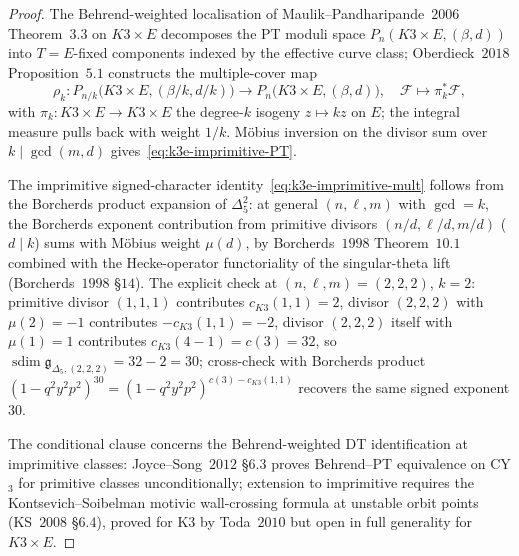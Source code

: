 \begin{proof}
The Behrend-weighted localisation of Maulik--Pandharipande~$2006$ Theorem~$3.3$ on $K3 \times E$ decomposes the PT moduli space $P_n(K3 \times E, (\beta, d))$ into $T = E$-fixed components indexed by the effective curve class; Oberdieck~$2018$ Proposition~$5.1$ constructs the multiple-cover map
\[
\rho_k: P_{n/k}\bigl(K3 \times E, (\beta/k, d/k)\bigr) \longrightarrow P_n\bigl(K3 \times E, (\beta, d)\bigr), \quad \mathcal{F} \longmapsto \pi^*_k \mathcal{F},
\]
with $\pi_k: K3 \times E \to K3 \times E$ the degree-$k$ isogeny $z \mapsto kz$ on $E$; the integral measure pulls back with weight $1/k$. Möbius inversion on the divisor sum over $k \mid \gcd(m, d)$ gives~\eqref{eq:k3e-imprimitive-PT}.

The imprimitive signed-character identity~\eqref{eq:k3e-imprimitive-mult} follows from the Borcherds product expansion of $\Delta_5^{2}$: at general $(n, \ell, m)$ with $\gcd = k$, the Borcherds exponent contribution from primitive divisors $(n/d, \ell/d, m/d)$ ($d \mid k$) sums with Möbius weight $\mu(d)$, by Borcherds~$1998$ Theorem~$10.1$ combined with the Hecke-operator functoriality of the singular-theta lift (Borcherds~$1998$ \S$14$). The explicit check at $(n, \ell, m) = (2, 2, 2)$, $k = 2$: primitive divisor $(1, 1, 1)$ contributes $c_{K3}(1, 1) = 2$, divisor $(2, 2, 2)$ with $\mu(2) = -1$ contributes $-c_{K3}(1, 1) = -2$, divisor $(2, 2, 2)$ itself with $\mu(1) = 1$ contributes $c_{K3}(4 - 1) = c(3) = 32$, so \(\operatorname{sdim}\mathfrak g_{\Delta_5,(2,2,2)}=32-2=30\); cross-check with Borcherds product $(1 - q^2 y^2 p^2)^{30} = (1 - q^2 y^2 p^2)^{c(3) - c_{K3}(1, 1)}$ recovers the same signed exponent $30$.

The conditional clause concerns the Behrend-weighted DT identification at imprimitive classes: Joyce--Song~$2012$ \S$6.3$ proves Behrend--PT equivalence on CY$_3$ for primitive classes unconditionally; extension to imprimitive requires the Kontsevich--Soibelman motivic wall-crossing formula at unstable orbit points (KS~$2008$ \S$6.4$), proved for K3 by Toda~$2010$ but open in full generality for $K3 \times E$.
\end{proof}

